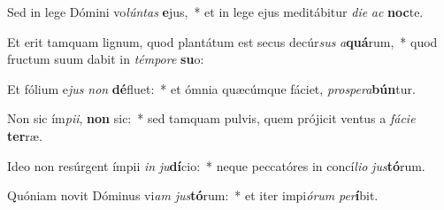 \item Sed in lege Dómini vo\textit{lún}\textit{tas} \textbf{e}jus,~* et in lege ejus meditábitur \textit{di}\textit{e} \textit{ac} \textbf{noc}te.
\item Et erit tamquam lignum, quod plantátum est secus decúr\textit{sus} \textit{a}\textbf{quá}rum,~* quod fructum suum dabit in \textit{tém}\textit{po}\textit{re} \textbf{su}o:
\item Et fólium e\textit{jus} \textit{non} \textbf{dé}fluet:~* et ómnia quæcúmque fáciet, \textit{pro}\textit{spe}\textit{ra}\textbf{bún}tur.
\item Non sic ím\textit{pi}\textit{i}, \textbf{non} sic:~* sed tamquam pulvis, quem prójicit ventus a \textit{fá}\textit{ci}\textit{e} \textbf{ter}ræ.
\item Ideo non resúrgent ímpii \textit{in} \textit{ju}\textbf{dí}cio:~* neque peccatóres in concí\textit{li}\textit{o} \textit{jus}\textbf{tó}rum.
\item Quóniam novit Dóminus vi\textit{am} \textit{jus}\textbf{tó}rum:~* et iter impi\textit{ó}\textit{rum} \textit{per}\textbf{í}bit.
